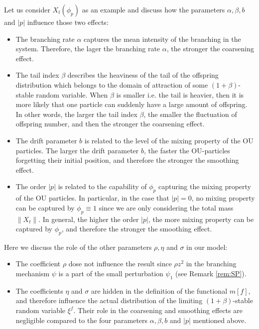 \documentclass[12pt,a4paper]{amsart}
\theoremstyle{plain}
\theoremstyle{definition}
\numberwithin{equation}{section}
\begin{document}
Let us consider $X_t(\phi_p)$ as an example and discuss how the parameters $\alpha, \beta, b$ and $|p|$
influence those two effects:
\begin{itemize}
\item
  The branching rate $\alpha$ captures the mean intensity of the branching in the system.
  Therefore, the lager the branching rate $\alpha$, the stronger the coarsening effect.
\item
  The tail index $\beta$ describes the heaviness of the tail of the offspring distribution which belongs to the domain of attraction of some $(1+\beta)$-stable random variable.
When $\beta$ is smaller i.e. the tail is heavier, then it is more likely that 
one particle can suddenly have a large amount of offspring.
In other words, the larger the tail index $\beta$, the smaller the fluctuation of offspring number, and then the stronger the coarsening effect.
\item
 The drift parameter $b$ is related to the level of the mixing property of the OU particles.
  The larger the drift parameter $b$, the faster the OU-particles forgetting their initial position, and therefore the stronger the smoothing effect.
\item
    The order $|p|$ is related to the capability of $\phi_p$ capturing the mixing property of the OU particles.
  In particular, in the case that $|p| = 0$, no mixing property can be captured by $\phi_p \equiv 1$ since we are only considering the total mass $\|X_t\|$.
  In general, the higher the order $|p|$, the more mixing property can be captured by $\phi_p$, and therefore the stronger the smoothing effect.
\end{itemize}
Here we discuss the role of the other parameters $\rho, \eta$ and $\sigma$ in our model:
\begin{itemize}
\item
  The coefficient $\rho$ dose not influence the result since $\rho z^2$ in the branching mechanism $\psi$ is a part of the small perturbation $\psi_1$
  (see Remark \ref{rem:SP}).
\item
  The coefficients $\eta$ and $\sigma$ are hidden in the definition of the functional $m[f]$, and therefore influence the actual distribution of the limiting $(1+\beta)$-stable random variable $\xi^f$.
  Their role in the coarsening and smoothing effects are negligible compared to the four parameters $\alpha, \beta, b$ and $|p|$ mentioned above.
\end{itemize}
\end{document}
